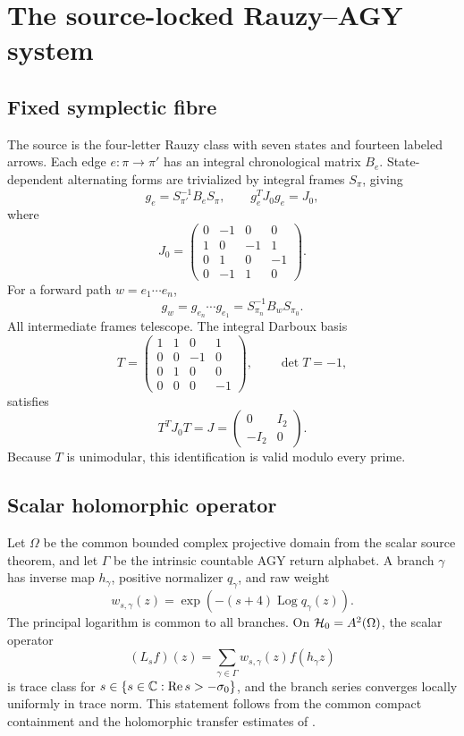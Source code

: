 \section{The source-locked Rauzy--AGY system}
\label{sec:source}

\subsection{Fixed symplectic fibre}

The source is the four-letter Rauzy class with seven states and fourteen
labeled arrows.  Each edge \(e:\pi\to\pi'\) has an integral chronological
matrix \(B_e\).  State-dependent alternating forms are trivialized by
integral frames \(S_\pi\), giving
\[
g_e=S_{\pi'}^{-1}B_eS_\pi,
\qquad
g_e^T J_0g_e=J_0,
\]
where
\[
J_0=
\begin{pmatrix}
0&-1&0&0\\
1&0&-1&1\\
0&1&0&-1\\
0&-1&1&0
\end{pmatrix}.
\]
For a forward path \(w=e_1\cdots e_n\),
\begin{equation}
g_w=g_{e_n}\cdots g_{e_1}
=S_{\pi_n}^{-1}B_wS_{\pi_0}.
\label{eq:telescope}
\end{equation}
All intermediate frames telescope.  The integral Darboux basis
\[
T=
\begin{pmatrix}
1&1&0&1\\
0&0&-1&0\\
0&1&0&0\\
0&0&0&-1
\end{pmatrix},
\qquad \det T=-1,
\]
satisfies
\[
T^TJ_0T=
J=\begin{pmatrix}0&I_2\\-I_2&0\end{pmatrix}.
\]
Because \(T\) is unimodular, this identification is valid modulo every
prime.

\subsection{Scalar holomorphic operator}

Let \(\Omega\) be the common bounded complex projective domain from the
scalar source theorem, and let \(\Gamma\) be the intrinsic countable AGY
return alphabet.  A branch \(\gamma\) has inverse map \(h_\gamma\), positive
normalizer \(q_\gamma\), and raw weight
\[
w_{s,\gamma}(z)
=\exp\!\left(-(s+4)\operatorname{Log}q_\gamma(z)\right).
\]
The principal logarithm is common to all branches.  On
\(\mathcal{H}_0=A^2(\Omega)\), the scalar operator
\[
(L_sf)(z)=\sum_{\gamma\in\Gamma}
w_{s,\gamma}(z)f(h_\gamma z)
\]
is trace class for \(s\in\{s\in\mathbb{C}:\operatorname{Re}s>-\sigma_0\}\), and the branch series converges
locally uniformly in trace norm.  This statement follows from the common
compact containment and the holomorphic transfer estimates of
\citet{bandtlow2008explicit,bandtlow2008ruelle}.

